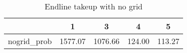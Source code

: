 \begin{table}[htbp]\centering
\caption{Endline takeup with no grid\label {tab1}}
\begin{tabular}{l*{4}{c}}
\toprule
            &           1&           3&           4&           5\\
\midrule
nogrid\_prob &     1577.07&     1076.66&      124.00&      113.27\\
\bottomrule
\end{tabular}
\end{table}
